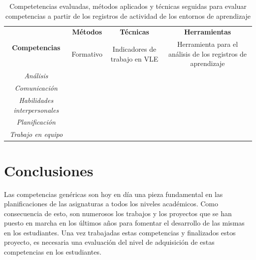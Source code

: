 \begin{table}
  \begin{center}
  \begin{tabular}{| c | c | c | c |}
    \hline
     \multirow{4}{*}{\textbf{Competencias}} & \textbf{Métodos} & \textbf{Técnicas} 		& \textbf{Herramientas} \\
    \cline{2-4}
     & \multirow{3}{*}{Formativo}  & \multirow{3}{3cm}{Indicadores de trabajo en VLE} & \multirow{3}{3.9cm}{Herramienta para el análisis de los registros de aprendizaje} \\
     &   								&  															& \\
     &   								&  															&  \\
    \hline
    \hline
    \emph{Análisis} & \multicolumn{3}{c|}{ \multirow{6}{*}{\cite{rayon2014web} }}  \\
    \cline{1-1}
    \emph{Comunicación} & \multicolumn{3}{c|}{}  \\
    \cline{1-1}
    \multirow{2}{3cm}{\emph{\centering Habilidades interpersonales}} & \multicolumn{3}{c|}{} \\
     & \multicolumn{3}{c|}{} \\
    \cline{1-1}
    \emph{Planificación} & \multicolumn{3}{c|}{}  \\
    \cline{1-1}
    \multirow{2}{*}{\emph{Trabajo en equipo}} & \multicolumn{3}{c|}{} \\
    \cline{2-4}
     & \multicolumn{3}{c|}{\cite{fidalgo:2015}}  \\
    \hline
  \end{tabular}
\end{center}
\caption{Competetencias evaluadas, métodos aplicados y técnicas seguidas para evaluar competencias a partir de los registros de actividad de los entornos de aprendizaje}
\label{tab:CompetenciasMetodosTecnicas}
\end{table}



\section{Conclusiones}

Las competencias genéricas son hoy en día una pieza fundamental en las planificaciones de las asignaturas a todos los niveles académicos. Como consecuencia de esto, son numerosos los trabajos y los proyectos que se han puesto en marcha en los últimos años para fomentar el desarrollo de las mismas en los estudiantes. Una vez trabajadas estas competencias y finalizados estos proyecto, es necesaria una evaluación del nivel de adquisición de estas competencias en los estudiantes.

